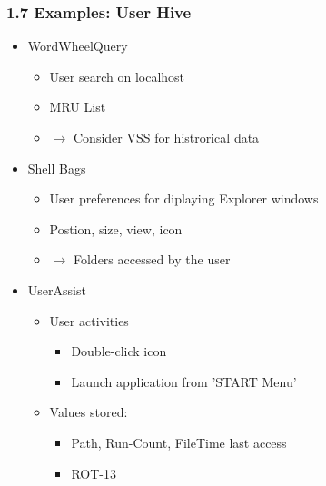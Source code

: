\begin{frame}[fragile]
  \frametitle{1.7 Examples: User Hive}
   \begin{itemize}
      \item WordWheelQuery
        \begin{itemize}
           \item User search on localhost
           \item MRU List
	   \item[] $\to$ Consider VSS for histrorical data
        \end{itemize}
      \item Shell Bags
        \begin{itemize}
          \item User preferences for diplaying Explorer windows
          \item Postion, size, view, icon
	  \item[] $\to$ Folders accessed by the user 
        \end{itemize}
      \item UserAssist
        \begin{itemize}
	  \item User activities
            \begin{itemize}
	      \item Double-click icon
              \item Launch application from 'START Menu'
            \end{itemize}
	  \item Values stored:
            \begin{itemize}
              \item Path, Run-Count, FileTime last access
              \item ROT-13
            \end{itemize}
        \end{itemize}
   \end{itemize}
\end{frame}


